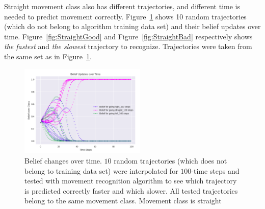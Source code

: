 

Straight movement class also has different trajectories, and different time is needed to predict movement correctly. Figure~\ref{fig:10Straight} shows 10 random trajectories (which do not belong to algorithm training data set) and their belief updates over time. Figure~\ref{fig:StraightGood} and Figure~\ref{fig:StraightBad} respectively shows \textit{the fastest} and \textit{the slowest} trajectory to recognize. Trajectories were taken from the same set as in Figure~\ref{fig:10Straight}.

\begin{figure}[H]
	\centering  	 
	\includegraphics[width=6cm]{img/netstraight.png}
	\caption{Belief changes over time. $10$ random trajectories (which does not belong to training data set) were interpolated for $100$-time steps and tested with movement recognition algorithm to see which trajectory is predicted correctly faster and which slower. All tested trajectories belong to the same movement class. Movement class is straight}
	\label{fig:10Straight}    
\end{figure}

